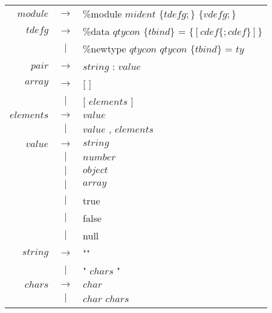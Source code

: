 \documentclass{article}
\begin{document}
\begin{tabular}{ r c l }
$module$	& $ \rightarrow $ 	& \%module $mident$ $\{ tdefg ; \}$ $\{ vdefg ; \}$	\\
$tdefg$ 	& $ \rightarrow $	& \%data $qtycon$ $\{ tbind \}$  =  $ \{ [ cdef \{ ; cdef \} ] \} $ \\
		& $ | $			& \%newtype $qtycon$ $qtycon$ $\{ tbind \}$ = $ty$	\\
$pair$		& $ \rightarrow $	& $string$ : $value$ 		\\
$array$		& $ \rightarrow $	& [ ]				\\
		& $ | $			& [ $elements$ ]		\\
$elements$ 	& $ \rightarrow $	& $value$			\\
		& $ | $			& $value$ , $elements$		\\
$value$		& $ \rightarrow $	& $string$			\\
		& $ | $			& $number$			\\
		& $ | $			& $object$			\\
		& $ | $			& $array$			\\
		& $ | $			& true				\\
		& $ | $			& false				\\
		& $ | $			& null				\\
$string$	& $ \rightarrow $	& ""				\\
		& $ | $			& " $chars$ "			\\
$chars$		& $ \rightarrow $	& $char$			\\
		& $ | $			& $char$ $chars$		\\


\end{tabular}
\end{document}
